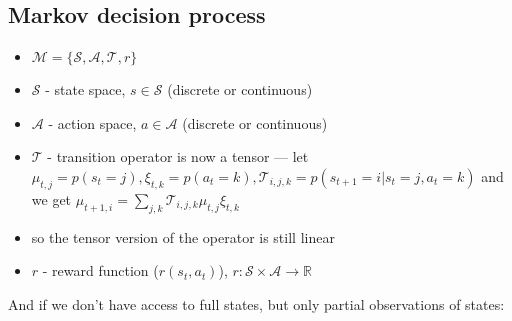 \documentclass{report}
\begin{document}
\subsection{Markov decision process}
\begin{figure}[htpb]
\begin{center}
\end{center}
\end{figure}
\begin{itemize}
		\item $\mathcal{M} = \{\mathcal{S}, \mathcal{A}, \mathcal{T}, r\}$
\item $\mathcal{S}$ - state space, $s \in \mathcal{S}$ (discrete or continuous)
\item $\mathcal{A}$ - action space, $a \in \mathcal{A}$ (discrete or continuous)
\item $\mathcal{T}$ - transition operator is now a tensor ---
		let $\mu_{t,j} = p(s_t = j), \xi_{t,k} = p(a_t = k), \mathcal{T}_{i,j,k} = p(s_{t+1} = i | s_t =j, a_t =k) $
		and we get $\mu_{t+1,i} = \sum_{j,k}^{} \mathcal{T}_{i,j,k} \mu_{t,j} \xi_{t,k}$
\item so the tensor version of the operator is still linear
\item $r$ - reward function ($r(s_t, a_t)$), $r : \mathcal{S} \times \mathcal{A} \to \mathbb{R}$
\end{itemize}
And if we don't have access to full states, but only partial observations of states:
\end{document}
